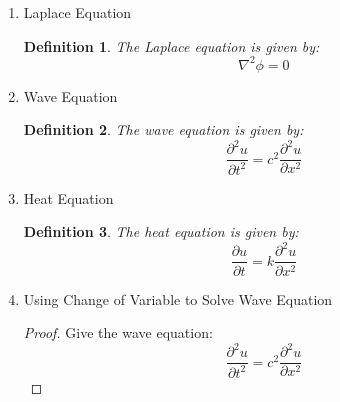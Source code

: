 \documentclass{article}
\newtheorem{definition}{Definition}[section]
\newtheorem{example}{Example}[section]
\begin{document}
\begin{enumerate}
\begin{example}
              Then we have:
              \begin{eqnarray}
                  && \begin{cases}
                      \omega^2 \frac{A_{0}}{2} = \frac{a_{0}}{2} \\
                      -A_{n} n^2 + \omega^2 A_{n} = a_{n}        \\
                      -B_{n} n^2 + \omega^2 B_{n} = b_{n} = 0
                  \end{cases}
                  \\
                  && \begin{cases}
                      A_{0} = \frac{a_{0}}{\omega^2}       \\
                      A_{n} = \frac{a_{n}}{n^2 - \omega^2} \\
                      B_{n} = 0
                  \end{cases}
              \end{eqnarray}

              The general solution is then:
              \begin{equation}
                  y(x) = c_1 \cos(\omega x) + c_2 \sin(\omega x) + y_p(x)
              \end{equation}
          \end{example}
    \item Laplace Equation
          \begin{definition}
              The Laplace equation is given by:
              \begin{equation}
                  \nabla ^2 \phi = 0
              \end{equation}
          \end{definition}
    \item Wave Equation
          \begin{definition}
              The wave equation is given by:
              \begin{equation}
                  \frac{\partial^2 u}{\partial t^2} = c^2 \frac{\partial^2 u}{\partial x^2}
              \end{equation}
          \end{definition}
    \item Heat Equation
          \begin{definition}
              The heat equation is given by:
              \begin{equation}
                  \frac{\partial u}{\partial t} = k \frac{\partial^2 u}{\partial x^2}
              \end{equation}
          \end{definition}
    \item Using Change of Variable to Solve Wave Equation
          \begin{proof}
              Give the wave equation:
              \begin{equation}
                  \frac{\partial^2 u}{\partial t^2} = c^2 \frac{\partial^2 u}{\partial x^2}
              \end{equation}


\end{proof}
\end{enumerate}
\end{document}

